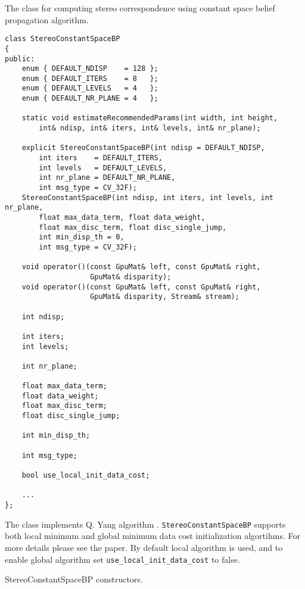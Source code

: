 The class for computing stereo correspondence using constant space belief propagation algorithm.

\begin{lstlisting}
class StereoConstantSpaceBP
{
public:
    enum { DEFAULT_NDISP    = 128 };
    enum { DEFAULT_ITERS    = 8   };
    enum { DEFAULT_LEVELS   = 4   };
    enum { DEFAULT_NR_PLANE = 4   };

    static void estimateRecommendedParams(int width, int height, 
        int& ndisp, int& iters, int& levels, int& nr_plane);

    explicit StereoConstantSpaceBP(int ndisp = DEFAULT_NDISP,
        int iters    = DEFAULT_ITERS,
        int levels   = DEFAULT_LEVELS,
        int nr_plane = DEFAULT_NR_PLANE,
        int msg_type = CV_32F);
    StereoConstantSpaceBP(int ndisp, int iters, int levels, int nr_plane,
        float max_data_term, float data_weight, 
        float max_disc_term, float disc_single_jump,
        int min_disp_th = 0,
        int msg_type = CV_32F);

    void operator()(const GpuMat& left, const GpuMat& right, 
                    GpuMat& disparity);
    void operator()(const GpuMat& left, const GpuMat& right, 
                    GpuMat& disparity, Stream& stream);

    int ndisp;

    int iters;
    int levels;

    int nr_plane;

    float max_data_term;
    float data_weight;
    float max_disc_term;
    float disc_single_jump;

    int min_disp_th;

    int msg_type;

    bool use_local_init_data_cost;
    
    ...
};
\end{lstlisting}

The class implements Q. Yang algorithm \cite{qx_csbp}. \texttt{StereoConstantSpaceBP} supports both local minimum and global minimum data cost initialization algortihms. For more details please see the paper. By default local algorithm is used, and to enable global algorithm set \texttt{use\_local\_init\_data\_cost} to false.


StereoConstantSpaceBP constructors.


